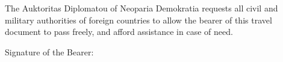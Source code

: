 \documentclass[a4paper,10pt]{article}
\begin{document}
    \vspace{4mm}

    \begin{minipage}[t][27mm][t]{174mm}
        \begin{minipage}[t][25mm][t]{84mm}
            The Auktoritas Diplomatou of Neoparia Demokratia requests all civil and military authorities
                of foreign countries to allow the bearer of this travel document to pass freely, and afford assistance in case of need.
        \end{minipage}\hfill%
        \begin{minipage}[t][25mm][t]{84mm}
            Signature of the Bearer:

            \newline
            \underline{\footnotesize\hspace{160pt}}
        \end{minipage}
        
    \end{minipage}
\end{document}
